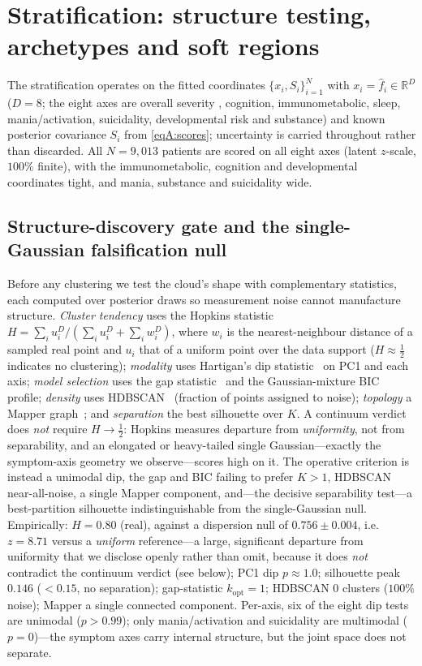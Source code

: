 \section{Stratification: structure testing, archetypes and soft regions}
\label{ann:stratification}

The stratification operates on the fitted coordinates $\{x_i,S_i\}_{i=1}^{N}$ with
$x_i=\hat f_i\in\mathbb{R}^{D}$ ($D=8$; the eight axes are overall severity \Gfac{},
cognition, immunometabolic, sleep, mania/activation, suicidality, developmental risk and
substance) and known posterior covariance $S_i$ from \eqref{eqA:scores}; uncertainty is
carried throughout rather than discarded. All $N=9{,}013$ patients are scored on all
eight axes (latent $z$-scale, $100\%$ finite), with the immunometabolic, cognition and
developmental coordinates tight, and mania, substance and suicidality wide.

\subsection{Structure-discovery gate and the single-Gaussian falsification null}

Before any clustering we test the cloud's shape with complementary statistics, each
computed over posterior draws so measurement noise cannot manufacture structure.
\emph{Cluster tendency} uses the Hopkins statistic
$H=\sum_i u_i^{D}/(\sum_i u_i^{D}+\sum_i w_i^{D})$, where $w_i$ is the
nearest-neighbour distance of a sampled real point and $u_i$ that of a uniform point
over the data support ($H\approx\tfrac12$ indicates no clustering); \emph{modality}
uses Hartigan's dip statistic~\citep{hartigan1985dip} on PC1 and each axis;
\emph{model selection} uses the gap statistic~\citep{tibshirani2001gap} and the
Gaussian-mixture BIC profile; \emph{density} uses HDBSCAN~\citep{campello2013hdbscan}
(fraction of points assigned to noise); \emph{topology} a Mapper
graph~\citep{singh2007mapper}; and \emph{separation} the best silhouette over $K$.
A continuum verdict does \emph{not} require $H\!\to\!\tfrac12$: Hopkins measures departure
from \emph{uniformity}, not from separability, and an elongated or heavy-tailed single
Gaussian---exactly the symptom-axis geometry we observe---scores high on it. The operative
criterion is instead a unimodal dip, the gap and BIC failing to prefer $K>1$, HDBSCAN
near-all-noise, a single Mapper component, and---the decisive separability test---a
best-partition silhouette indistinguishable from the single-Gaussian null. Empirically:
$H=0.80$ (real), against a dispersion null of $0.756\pm0.004$, i.e.\ $z=8.71$ versus a
\emph{uniform} reference---a large, significant departure from uniformity that we disclose
openly rather than omit, because it does \emph{not} contradict the continuum verdict (see
below); PC1 dip $p\approx1.0$; silhouette peak $0.146$ ($<0.15$, no separation);
gap-statistic $k_{\text{opt}}=1$; HDBSCAN $0$ clusters ($100\%$ noise); Mapper a single
connected component. Per-axis, six of the eight dip tests are unimodal ($p>0.99$); only
mania/activation and suicidality are multimodal ($p=0$)---the symptom axes carry internal
structure, but the joint space does not separate.

